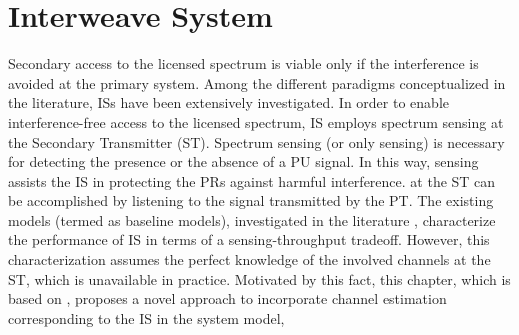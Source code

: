 \chapter{Interweave System}
\label{chap:IS}
Secondary access to the licensed spectrum is viable only if the interference is avoided at the primary system. %
Among the different paradigms conceptualized in the literature, ISs have been extensively investigated. %
In order to enable interference-free access to the licensed spectrum, IS employs spectrum sensing at the Secondary Transmitter (ST). 
Spectrum sensing (or only sensing) is necessary for detecting the presence or the absence of a PU signal. In this way, sensing assists the IS in protecting the PRs against harmful interference.  at the ST can be accomplished by listening to the signal transmitted by the PT.
The existing models (termed as baseline models), investigated in the literature \cite{Liang08, Sharma14, Pradhan15}, characterize the performance of IS in terms of a sensing-throughput tradeoff. However, this characterization assumes the perfect knowledge of the involved channels at the ST, which is unavailable in practice. 
Motivated by this fact, this chapter, which is based on , proposes a novel approach to incorporate channel estimation corresponding to the IS in the system model, %
